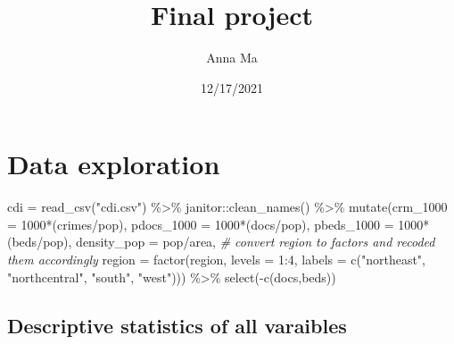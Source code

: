 \documentclass[
]{article}
\title{Final project}
\author{Anna Ma}
\date{12/17/2021}
\newenvironment{Shaded}{\begin{snugshade}}{\end{snugshade}}
\newcommand{\AttributeTok}[1]{\textcolor[rgb]{0.77,0.63,0.00}{#1}}
\newcommand{\CommentTok}[1]{\textcolor[rgb]{0.56,0.35,0.01}{\textit{#1}}}
\newcommand{\DecValTok}[1]{\textcolor[rgb]{0.00,0.00,0.81}{#1}}
\newcommand{\FunctionTok}[1]{\textcolor[rgb]{0.00,0.00,0.00}{#1}}
\newcommand{\NormalTok}[1]{#1}
\newcommand{\OtherTok}[1]{\textcolor[rgb]{0.56,0.35,0.01}{#1}}
\newcommand{\SpecialCharTok}[1]{\textcolor[rgb]{0.00,0.00,0.00}{#1}}
\newcommand{\StringTok}[1]{\textcolor[rgb]{0.31,0.60,0.02}{#1}}
\begin{document}
\maketitle

\hypertarget{data-exploration}{%
\section{Data exploration}\label{data-exploration}}

\begin{Shaded}
\begin{Highlighting}[]
\NormalTok{cdi }\OtherTok{=} \FunctionTok{read\_csv}\NormalTok{(}\StringTok{"cdi.csv"}\NormalTok{) }\SpecialCharTok{\%\textgreater{}\%}
\NormalTok{  janitor}\SpecialCharTok{::}\FunctionTok{clean\_names}\NormalTok{() }\SpecialCharTok{\%\textgreater{}\%}
  \FunctionTok{mutate}\NormalTok{(}\AttributeTok{crm\_1000 =} \DecValTok{1000}\SpecialCharTok{*}\NormalTok{(crimes}\SpecialCharTok{/}\NormalTok{pop),}
         \AttributeTok{pdocs\_1000 =} \DecValTok{1000}\SpecialCharTok{*}\NormalTok{(docs}\SpecialCharTok{/}\NormalTok{pop),}
         \AttributeTok{pbeds\_1000 =} \DecValTok{1000}\SpecialCharTok{*}\NormalTok{(beds}\SpecialCharTok{/}\NormalTok{pop),}
         \AttributeTok{density\_pop =}\NormalTok{ pop}\SpecialCharTok{/}\NormalTok{area,}
         \CommentTok{\# convert region to factors and recoded them accordingly }
         \AttributeTok{region =} \FunctionTok{factor}\NormalTok{(region, }\AttributeTok{levels =} \DecValTok{1}\SpecialCharTok{:}\DecValTok{4}\NormalTok{,}
                    \AttributeTok{labels =} \FunctionTok{c}\NormalTok{(}\StringTok{"northeast"}\NormalTok{, }\StringTok{"northcentral"}\NormalTok{, }\StringTok{"south"}\NormalTok{, }\StringTok{"west"}\NormalTok{))) }\SpecialCharTok{\%\textgreater{}\%} \FunctionTok{select}\NormalTok{(}\SpecialCharTok{{-}}\FunctionTok{c}\NormalTok{(docs,beds))}
\end{Highlighting}
\end{Shaded}

\hypertarget{descriptive-statistics-of-all-varaibles}{%
\subsection{Descriptive statistics of all
varaibles}\label{descriptive-statistics-of-all-varaibles}}
\end{document}
